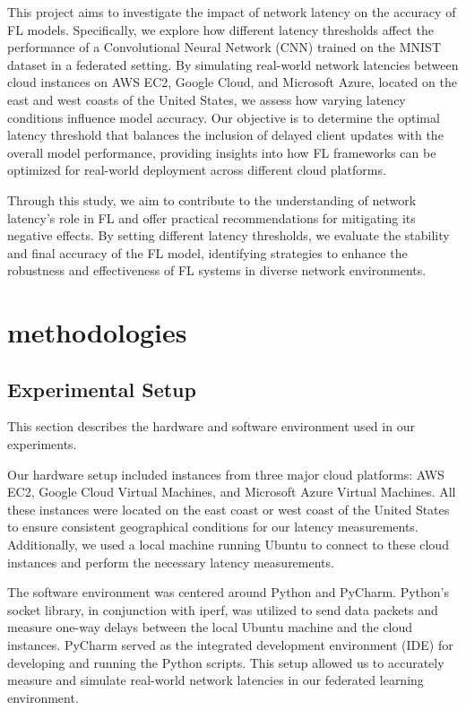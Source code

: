 \documentclass[conference]{IEEEtran}
\begin{document}
This project aims to investigate the impact of network latency on the accuracy of FL models. Specifically, we explore how different latency thresholds affect the performance of a Convolutional Neural Network (CNN) trained on the MNIST dataset in a federated setting. By simulating real-world network latencies between cloud instances on AWS EC2, Google Cloud, and Microsoft Azure, located on the east and west coasts of the United States, we assess how varying latency conditions influence model accuracy. Our objective is to determine the optimal latency threshold that balances the inclusion of delayed client updates with the overall model performance, providing insights into how FL frameworks can be optimized for real-world deployment across different cloud platforms.

Through this study, we aim to contribute to the understanding of network latency's role in FL and offer practical recommendations for mitigating its negative effects. By setting different latency thresholds, we evaluate the stability and final accuracy of the FL model, identifying strategies to enhance the robustness and effectiveness of FL systems in diverse network environments.

\section{methodologies}

\subsection{Experimental Setup}

This section describes the hardware and software environment used in our experiments.

Our hardware setup included instances from three major cloud platforms: AWS EC2, Google Cloud Virtual Machines, and Microsoft Azure Virtual Machines. All these instances were located on the east coast or west coast of the United States to ensure consistent geographical conditions for our latency measurements. Additionally, we used a local machine running Ubuntu to connect to these cloud instances and perform the necessary latency measurements.

The software environment was centered around Python and PyCharm. Python's socket library, in conjunction with iperf, was utilized to send data packets and measure one-way delays between the local Ubuntu machine and the cloud instances. PyCharm served as the integrated development environment (IDE) for developing and running the Python scripts. This setup allowed us to accurately measure and simulate real-world network latencies in our federated learning environment.
\end{document}
